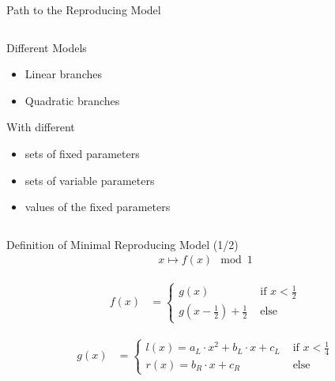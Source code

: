 \begin{frame}{Path to the Reproducing Model}
	\begin{columns}
		\begin{column}{.5 \textwidth}
			Different Models
			\begin{itemize}
				\item Linear branches
				\item Quadratic branches
			\end{itemize}

			\vspace{2em}
			With different
			\begin{itemize}
				\item sets of fixed parameters
				\item sets of variable parameters
				\item values of the fixed parameters
			\end{itemize}
		\end{column}
		\begin{column}{.5 \textwidth}
			\vspace{-3.0em}
			\begin{figure}
				\centering
				\qquad
				\\
				\qquad
			\end{figure}
		\end{column}
	\end{columns}
\end{frame}

\begin{frame}{Definition of Minimal Reproducing Model (1/2)}
	\vspace{-3.0em}
	\begin{align}
		x \mapsto f(x) \mod 1
	\end{align}

	\begin{align}
		f(x) & = \begin{cases}
			         g(x)                                        & \text{ if } x < \frac{1}{2} \\
			         g\left(x - \frac{1}{2}\right) + \frac{1}{2} & \text{ else}
		         \end{cases}
	\end{align}

	\begin{align}
		g(x) & = \begin{cases}
			         l(x) = a_L \cdot x^2 + b_L \cdot x + c_L & \text{ if } x < \frac{1}{4} \\
			         r(x) = b_R \cdot x + c_R                 & \text{ else}
		         \end{cases}
	\end{align}
\end{frame}

